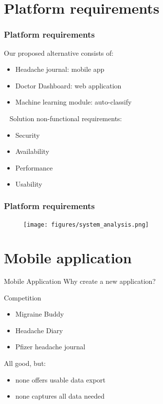 \documentclass[english]{beamer}
\begin{document}
\section{Platform requirements}
\label{sec:platform_req}
\begin{frame}
	\frametitle{Platform requirements}


		Our proposed alternative consists of:
		\begin{itemize}
			\item Headache journal: mobile app
			\item Doctor Dashboard: web application
			\item Machine learning module: auto-classify
		\end{itemize}
		\ \newline
		Solution non-functional requirements:
		\begin{itemize}
			\item Security
			\item Availability
			\item Performance
			\item Usability
		\end{itemize}
\end{frame}
\begin{frame}
		\frametitle{Platform requirements}
		\begin{figure}[!h]
			\texttt{[image: figures/system\_analysis.png]}
		\end{figure}	
	
\end{frame}
\section{Mobile application}
\begin{frame}{Mobile Application}
	Why create a new application? 
	\begin{block}{Competition}{}
		\begin{itemize}
			\item Migraine Buddy
			\item Headache Diary
			\item Pfizer headache journal
		\end{itemize}
	\end{block}
	\pause
	All good, but:
	\pause
	\begin{itemize}
		\item none offers usable data export
		\item none captures all data needed
	\end{itemize} 
\end{frame}
\end{document}
